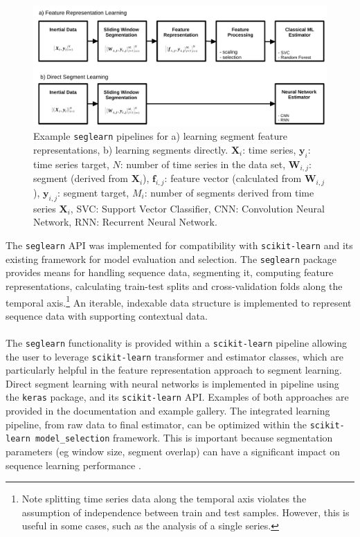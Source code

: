 \documentclass[twoside,11pt]{article}
\begin{document}
\begin{figure}[!htb]
  \begin{center}
    \includegraphics[scale=0.5]{fig1_pipe.pdf}
  \end{center}
  \caption{Example \texttt{seglearn} pipelines for a) learning segment feature representations, b) learning segments directly. $\bm{X}_i$: time series, $\bm{y}_i$: time series target, $N$: number of time series in the data set, $\bm{W}_{i,j}$: segment (derived from $\bm{X}_i$), $\bm{f}_{i,j}$: feature vector (calculated from $\bm{W}_{i,j}$), $\bm{y}_{i,j}$: segment target, $M_i$: number of segments derived from time series $\bm{X}_i$, SVC: Support Vector Classifier, CNN: Convolution Neural Network, RNN: Recurrent Neural Network.}
  \label{f:pipe}
\end{figure}

The \texttt{seglearn} API was implemented for compatibility with \texttt{scikit-learn} and its existing framework for model evaluation and selection. The \texttt{seglearn} package provides means for handling sequence data, segmenting it, computing feature representations, calculating train-test splits and cross-validation folds along the temporal axis.\footnote{Note splitting time series data along the temporal axis violates the assumption of independence between train and test samples. However, this is useful in some cases, such as the analysis of a single series.} An iterable, indexable data structure is implemented to represent sequence data with supporting contextual data. 

\paragraph{}
The \texttt{seglearn} functionality is provided within a \texttt{scikit-learn} pipeline allowing the user to leverage \texttt{scikit-learn} transformer and estimator classes, which are particularly helpful in the feature representation approach to segment learning. Direct segment learning with neural networks is implemented in pipeline using the \texttt{keras} package, and its \texttt{scikit-learn} API. Examples of both approaches are provided in the documentation and example gallery. The integrated learning pipeline, from raw data to final estimator, can be optimized within the \texttt{scikit-learn model{\_}selection} framework. This is important because segmentation parameters (eg window size, segment overlap) can have a significant impact on sequence learning performance \citep{burns_shoulder_2018, bulling_tutorial_2014}. 
\end{document}
